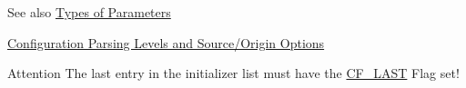 \begin{DoxySeeAlso}{See also}
\hyperlink{parameter_types}{Types of Parameters} 

\hyperlink{config_levels}{Configuration Parsing Levels and Source/\-Origin Options}
\end{DoxySeeAlso}
\begin{DoxyAttention}{Attention}
The last entry in the initializer list must have the \hyperlink{group__special__options__mask_gaa4d82cea91ede4aee78594417894e368}{C\-F\-\_\-\-L\-A\-S\-T} Flag set! 
\end{DoxyAttention}
